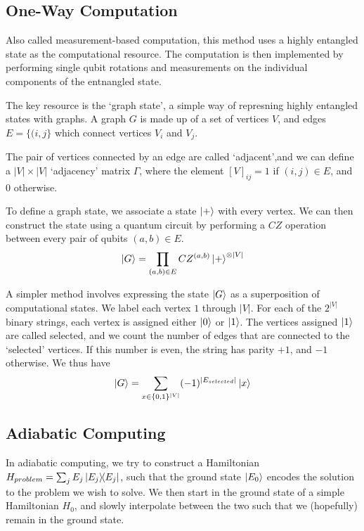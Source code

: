 \documentclass[11pt]{article}
\begin{document}
\subsection*{One-Way Computation}

Also called measurement-based computation, this method uses a highly entangled state as the computational resource. The computation is then implemented by performing single qubit rotations and measurements on the individual components of the entnangled state.

The key resource is the `graph state', a simple way of represning highly entangled states with graphs. A graph $G$ is made up of a set of vertices $V$, and edges $E=\{(i,j\}$ which connect vertices $V_{i}$ and $V_{j}$.

The pair of vertices connected by an edge are called `adjacent',and we can define a $|V|\times|V|$ `adjacency' matrix $\Gamma$, where the element $[V]_{ij}=1$ if $(i,j)\in E$, and 0 otherwise.

To define a graph state, we associate a state $\ket{+}$ with every vertex. We can then construct the state using a quantum circuit by performing a $CZ$ operation between every pair of qubits $(a,b)\in E$.
\begin{equation}
    \ket{G}=\prod_{(a,b)\in E}CZ^{(a,b)}\ket{+}^{\otimes|V|}
\end{equation}

A simpler method involves expressing the state $\ket{G}$ as a superposition of computational states. We label each vertex $1$ through $|V|$. For each of the $2^{|V|}$ binary strings, each vertex is assigned either $\ket{0}$ or $\ket{1}$. The vertices assigned $\ket{1}$ are called selected, and we count the number of edges that are connected to the `selected' vertices. If this number is even, the string has parity $+1$, and $-1$ otherwise. We thus have
\begin{equation}
    \ket{G}=\sum_{x\in\{0,1\}^{|V|}}(-1)^{|E_{selected}|}\ket{x}
\end{equation}

\subsection*{Adiabatic Computing}

In adiabatic computing, we try to construct a Hamiltonian $H_{problem}=\sum_{j}E_{j}\ketbra{E_{j}}{E_{j}}$, such that the ground state $\ket{E_{0}}$ encodes the solution to the problem we wish to solve. We then start in the ground state of a simple Hamiltonian $H_{0}$, and slowly interpolate between the two such that we (hopefully) remain in the ground state.
\end{document}
